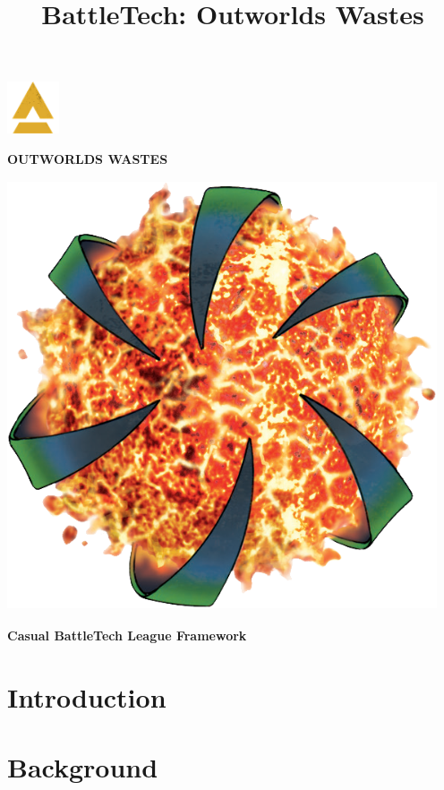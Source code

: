 \documentclass{article}
\title{BattleTech: Outworlds Wastes}
\author{}
\date{}
\newcommand{\sectiontitle}{}
\newcommand{\newsection}[2]{\renewcommand{\sectiontitle}{#2}\section{#1}}
\begin{document}
\makeatletter
{}

\begin{center}
  \mbox{\fontsize{50}{60}\bfseries{}\includegraphics[alt='a', width=0.6in, height=0.6in]{img/Battletech-A.png}\fontsize{50}{60}\bfseries{}}

  \fontsize{30}{37}\bfseries\selectfont\MakeUppercase{Outworlds Wastes}

  \includegraphics[alt='Outworlds Alliance logo', width=5in, height=5in]{img/Outworlds-Alliance.png}

  \LARGE\bfseries{Casual BattleTech League Framework}
\end{center}

\newsection{Introduction}{introduction}



\newpage

\newsection{Background}{background}
\end{document}
